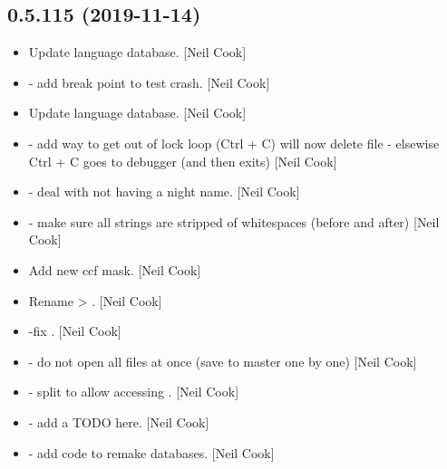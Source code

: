 \documentclass[a4paper,10pt,english]{report}
\begin{document}
\subsection{0.5.115 (2019-11-14)}
\label{\detokenize{misc/changelog:id27}}\begin{itemize}
\item {} 
Update language database. {[}Neil Cook{]}

\item {} 
 - add break point to test crash. {[}Neil
Cook{]}

\item {} 
Update language database. {[}Neil Cook{]}

\item {} 
 - add way to get out of lock loop (Ctrl + C) will now
delete file - elsewise Ctrl + C goes to debugger (and then exits)
{[}Neil Cook{]}

\item {} 
 - deal with not having a night name. {[}Neil
Cook{]}

\item {} 
 - make sure all strings are stripped of
whitespaces (before and after) {[}Neil Cook{]}

\item {} 
Add new ccf mask. {[}Neil Cook{]}

\item {} 
Rename  \textendash{}\textgreater{} . {[}Neil Cook{]}

\item {} 
 -fix . {[}Neil Cook{]}

\item {} 
 - do not open all files at once (save to master
one by one) {[}Neil Cook{]}

\item {} 
 - split  to allow accessing
. {[}Neil Cook{]}

\item {} 
 - add a TODO here. {[}Neil Cook{]}

\item {} 
 - add code to remake databases. {[}Neil Cook{]}


\end{itemize}
\end{document}
